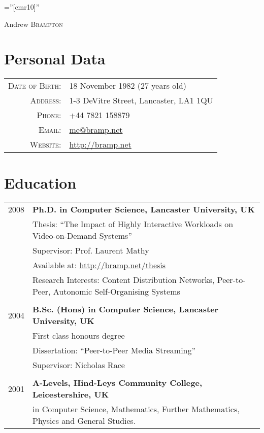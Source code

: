 \documentclass[a4paper,10pt]{article}
\begin{document}
\pagestyle{empty} %

\font\fb=''[cmr10]'' %

\par{\centering
		{\Huge Andrew \textsc{Brampton}
	}\bigskip\par}

\section{Personal Data}

\begin{tabular}{rl}
    \textsc{Date of Birth:} & 18 November 1982 (27 years old) \\
    \textsc{Address:}   & 1-3 DeVitre Street, Lancaster, LA1 1QU \\
    \textsc{Phone:}     & +44 7821 158879\\
    \textsc{Email:}     & \href{mailto:me@bramp.net}{me@bramp.net}\\
    \textsc{Website:}   & \href{mailto:http://bramp.net}{http://bramp.net}\\
\end{tabular}

\section{Education}
\begin{tabular}{rp{14cm}}	
 \textsc{2008} & \textbf{Ph.D. in Computer Science, Lancaster University, UK}\\
& Thesis: ``The Impact of Highly Interactive Workloads on Video-on-Demand Systems''\\
& Supervisor: Prof. Laurent Mathy\\
& Available at: \href{http://bramp.net/thesis}{http://bramp.net/thesis}\\
& Research Interests: Content Distribution Networks, Peer-to-Peer, Autonomic Self-Organising Systems\\
&\\

\textsc{2004} & \textbf{B.Sc. (Hons) in Computer Science, Lancaster University, UK}\\
& First class honours degree\\
& Dissertation: ``Peer-to-Peer Media Streaming''\\
& Supervisor: Nicholas Race\\
&\\

\textsc{2001} & \textbf{A-Levels, Hind-Leys Community College, Leicestershire, UK}\\
& in Computer Science, Mathematics, Further Mathematics, Physics and General Studies.\\

\end{tabular}
\end{document}
